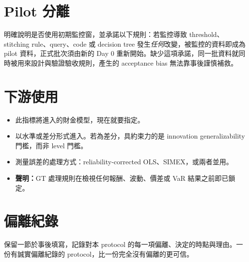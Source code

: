 \documentclass[12pt,a4paper,oneside]{article}
\begin{document}
\section{Pilot 分離}

明確說明是否使用初期監控窗，並承諾以下規則：若監控導致 threshold、stitching rule、query、code 或 decision tree 發生\emph{任何}改變，被監控的資料即成為 pilot 資料，正式批次須由新的 Day 0 重新開始。缺少這項承諾，同一批資料就同時被用來設計與驗證驗收規則，產生的 acceptance bias 無法靠事後謹慎補救。

\section{下游使用}

\begin{itemize}
\item 此指標將進入的財金模型，現在就要指定。
\item 以水準或差分形式進入。若為差分，具約束力的是 innovation generalizability 門檻，而非 level 門檻。
\item 測量誤差的處理方式：reliability-corrected OLS、SIMEX，或兩者並用。
\item \textbf{聲明：}GT 處理規則在檢視任何報酬、波動、價差或 VaR 結果之前即已鎖定。
\end{itemize}

\section{偏離紀錄}

保留一節於事後填寫，記錄對本 protocol 的每一項偏離、決定的時點與理由。一份有誠實偏離紀錄的 protocol，比一份完全沒有偏離的更可信。
\end{document}
